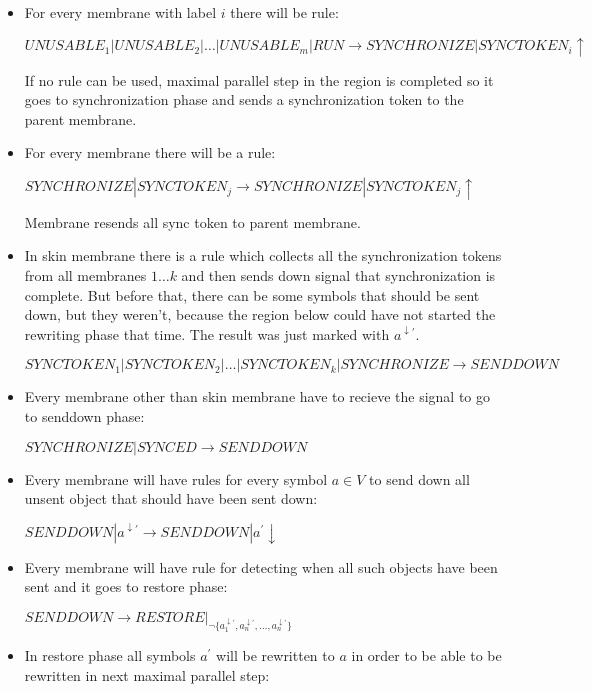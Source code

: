 \begin{dokaz}
\begin{itemize}
    

    \item For every membrane with label $i$ there will be rule:

    $UNUSABLE_1|UNUSABLE_2|\dots|UNUSABLE_m|RUN \rightarrow SYNCHRONIZE|SYNCTOKEN_i\uparrow$

    If no rule can be used, maximal parallel step in the region is completed so it goes to synchronization phase and sends a synchronization token to the parent membrane.

    \item For every membrane there will be a rule:

    $SYNCHRONIZE|SYNCTOKEN_j \rightarrow SYNCHRONIZE|SYNCTOKEN_j\uparrow$

    Membrane resends all sync token to parent membrane.

    \item In skin membrane there is a rule which collects all the synchronization tokens from all membranes $1\dots k$ and then sends down signal that synchronization is complete. But before that, there can be some symbols that should be sent down, but they weren't, because the region below could have not started the rewriting phase that time. The result was just marked with $a^{\downarrow\prime}$.

    $SYNCTOKEN_1|SYNCTOKEN_2|\dots|SYNCTOKEN_k|SYNCHRONIZE \rightarrow SENDDOWN$

    \item Every membrane other than skin membrane have to recieve the signal to go to senddown phase:

    $SYNCHRONIZE|SYNCED \rightarrow SENDDOWN$

    \item Every membrane will have rules for every symbol $a\in V$ to send down all unsent object that should have been sent down:

    $SENDDOWN|a^{\downarrow\prime} \rightarrow SENDDOWN|a^{\prime}\downarrow$

    \item Every membrane will have rule for detecting when all such objects have been sent and it goes to restore phase:

    $SENDDOWN \rightarrow RESTORE|_{\neg \{a_1^{\downarrow\prime}, a_n^{\downarrow\prime}, \dots, a_n^{\downarrow\prime}\}}$

    \item In restore phase all symbols $a^{\prime}$ will be rewritten to $a$ in order to be able to be rewritten in next maximal parallel step:


\end{itemize}
\end{dokaz}
